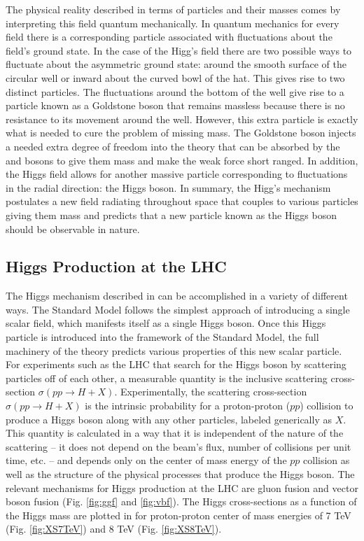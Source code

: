 The physical reality described in terms of particles and their masses comes 
by interpreting this field quantum mechanically.
In quantum mechanics for every field there is a
corresponding particle associated with fluctuations about the field's ground
state. In the case of the Higg's field there are two possible ways to fluctuate
about the asymmetric ground state: around the smooth surface of the circular well
or inward about the curved bowl of the hat. This gives rise to two distinct 
particles. The fluctuations around the bottom of the well give rise to a particle 
known as a Goldstone boson that remains massless because there is no resistance
to its movement around the well. However, this extra particle is exactly what
is needed to cure the problem of missing mass. The Goldstone boson injects
a needed extra degree of freedom into the theory
that can be absorbed by the \WBosons and \ZBoson
bosons to give them mass and make the weak force short ranged. In addition, 
the Higgs field allows for
another massive particle corresponding to fluctuations in the radial
direction: the Higgs boson. In summary, the Higg's mechanism postulates a new field
radiating throughout space that couples to various particles giving them mass
and predicts that a new particle known as the Higgs boson should be observable
in nature.


\subsection{Higgs Production at the LHC}
\label{subsec:prodproc}

The Higgs mechanism described in  can be accomplished
in a variety of different ways. The Standard Model follows the simplest approach
of introducing a single scalar field, which manifests itself as a single Higgs boson.
Once this Higgs particle is introduced into the framework of the Standard Model,
the full machinery of the theory predicts various properties of this new scalar
particle. For experiments such as the LHC that search for the Higgs boson
by scattering particles off of each other, a measurable quantity is the
inclusive scattering cross-section $\sigma(pp \to H + X)$. 
Experimentally, the scattering cross-section $\sigma(pp \to H + X)$ is the
intrinsic probability for a proton-proton ($pp$) collision to produce
a Higgs boson along with any other particles, labeled generically as $X$.
This quantity is calculated in a way that it is independent of the nature
of the scattering -- it does not depend on the beam's flux, number of collisions 
per unit time, etc. -- and depends only on the center of mass energy of the
$pp$ collision as well as the structure of the physical processes that produce the
Higgs boson. The relevant mechanisms  for Higgs production 
at the LHC are gluon fusion and vector boson fusion 
\cite{LHCHiggsCrossSectionWorkingGroup:2011ti} (Fig. \ref{fig:ggf} and \ref{fig:vbf}).
The Higgs cross-sections as a function of the Higgs mass are plotted in 
 for proton-proton center of mass energies of 7 TeV (Fig. \ref{fig:XS7TeV}) and 8 TeV (Fig. \ref{fig:XS8TeV}).

